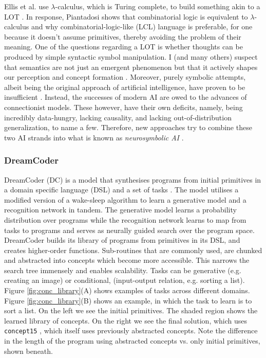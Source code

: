 Ellis et al. use $\lambda$-calculus, which is Turing complete, to build something akin to a LOT \cite{ellis_dreamcoder_2021}. In response, Piantadosi shows that combinatorial logic is equivalent to $\lambda$-calculus and why combinatorial-logic-like (LCL) language is preferable, for one because it doesn't assume primitives, thereby avoiding the problem of their meaning. 
One of the questions regarding a LOT is whether thoughts can be produced by simple syntactic symbol manipulation.
I (and many others) suspect that semantics are not just an emergent phenomenon but that it actively shapes our perception and concept formation \cite{santoro2021symbolic, hofstadter_gdel_1979}.
Moreover, purely symbolic attempts, albeit being the original approach of artificial intelligence, have proven to be insufficient \cite{garcez2020neurosymbolic}. Instead, the successes of modern AI are owed to the advances of connectionist models. These however, have their own deficits, namely, being incredibly data-hungry, lacking causality, and lacking out-of-distribution generalization, to name a few. Therefore, new approaches try to combine these two AI strands into what is known as \emph{neurosymbolic AI} \cite{garcez2020neurosymbolic}.


\subsubsection{DreamCoder}
DreamCoder (DC) is a model that synthesises programs from initial primitives in a domain specific language (DSL) and a set of tasks \cite{ellis_dreamcoder_2021}. The model utilises a modified version of a wake-sleep algorithm \cite{hinton1995wake} to learn a generative model and a recognition network in tandem. The generative model learns a probability distribution over programs while the recognition network learns to map from tasks to programs and serves as neurally guided search over the program space.
DreamCoder builds its library of programs from primitives in its DSL, and creates higher-order functions.
Sub-routines that are commonly used, are chunked and abstracted into concepts which become more accessible. This narrows the search tree immensely and enables scalability.
Tasks can be generative (e.g. creating an image) or conditional, (input-output relation, e.g. sorting a list).
Figure \ref{fig:conc_library}(A) shows examples of tasks across different domains. 
Figure \ref{fig:conc_library}(B) shows an example, in which the task to learn is to sort a list. On the left we see the initial primitives. The shaded region shows the learned library of concepts. On the right we see the final solution, which uses \texttt{concept15} , which itself uses previously abstracted concepts. Note the difference in the length of the program using abstracted concepts vs. only initial primitives, shown beneath.

